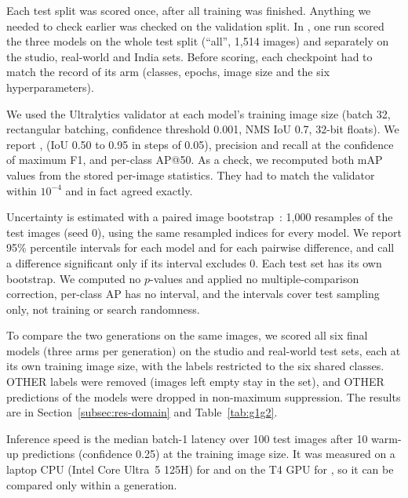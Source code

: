 Each test split was scored once, after all training was finished. Anything we needed to check earlier was checked on the validation split. In \gentwo, one run scored the three models on the whole test split (``all'', 1,514 images) and separately on the studio, real-world and India sets. Before scoring, each checkpoint had to match the record of its arm (classes, epochs, image size and the six hyperparameters).

We used the Ultralytics validator at each model's training image size (batch 32, rectangular batching, confidence threshold 0.001, NMS IoU 0.7, 32-bit floats). We report \mapfifty, \mapfiftyninetyfive (IoU 0.50 to 0.95 in steps of 0.05), precision and recall at the confidence of maximum F1, and per-class AP@50. As a check, we recomputed both mAP values from the stored per-image statistics. They had to match the validator within $10^{-4}$ and in fact agreed exactly.

Uncertainty is estimated with a paired image bootstrap~\cite{efron1993introduction}: 1,000 resamples of the test images (seed 0), using the same resampled indices for every model. We report 95\% percentile intervals for each model and for each pairwise difference, and call a difference significant only if its interval excludes 0. Each \gentwo test set has its own bootstrap. We computed no $p$-values and applied no multiple-comparison correction, per-class AP has no interval, and the intervals cover test sampling only, not training or search randomness.

To compare the two generations on the same images, we scored all six final models (three arms per generation) on the studio and real-world test sets, each at its own training image size, with the labels restricted to the six shared classes. OTHER labels were removed (images left empty stay in the set), and OTHER predictions of the \gentwo models were dropped in non-maximum suppression. The results are in Section~\ref{subsec:res-domain} and Table~\ref{tab:g1g2}.

Inference speed is the median batch-1 latency over 100 test images after 10 warm-up predictions (confidence 0.25) at the training image size. It was measured on a laptop CPU (Intel Core Ultra~5 125H) for \genone and on the T4 GPU for \gentwo, so it can be compared only within a generation.
